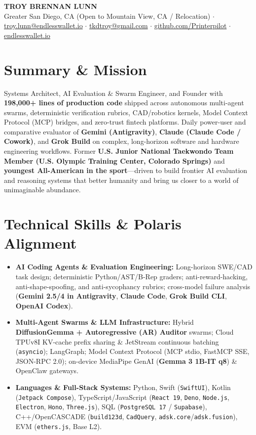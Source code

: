 \documentclass[10pt,letterpaper]{article}
\begin{document}
\begin{center}
    {\LARGE \textbf{TROY BRENNAN LUNN}} \\[2pt]
    Greater San Diego, CA (Open to Mountain View, CA / Relocation) $\cdot$
    \href{mailto:troy.lunn@endlesswallet.io}{troy.lunn@endlesswallet.io} $\cdot$
    \href{mailto:tkdtroy@gmail.com}{tkdtroy@gmail.com} $\cdot$
    \href{https://github.com/Printerpilot}{github.com/Printerpilot} $\cdot$
    \href{https://endlesswallet.io}{endlesswallet.io}
\end{center}

\section{Summary \& Mission}
Systems Architect, AI Evaluation \& Swarm Engineer, and Founder with \textbf{198,000+ lines of production code} shipped across autonomous multi-agent swarms, deterministic verification rubrics, CAD/robotics kernels, Model Context Protocol (MCP) bridges, and zero-trust fintech platforms. Daily power-user and comparative evaluator of \textbf{Gemini (Antigravity)}, \textbf{Claude (Claude Code / Cowork)}, and \textbf{Grok Build} on complex, long-horizon software and hardware engineering workflows. Former \textbf{U.S. Junior National Taekwondo Team Member (U.S. Olympic Training Center, Colorado Springs)} and \textbf{youngest All-American in the sport}---driven to build frontier AI evaluation and reasoning systems that better humanity and bring us closer to a world of unimaginable abundance.

\section{Technical Skills \& Polaris Alignment}
\begin{itemize}
    \item \textbf{AI Coding Agents \& Evaluation Engineering:} Long-horizon SWE/CAD task design; deterministic Python/AST/B-Rep graders; anti-reward-hacking, anti-shape-spoofing, and anti-sycophancy rubrics; cross-model failure analysis (\textbf{Gemini 2.5/4 in Antigravity}, \textbf{Claude Code}, \textbf{Grok Build CLI}, \textbf{OpenAI Codex}).
    \item \textbf{Multi-Agent Swarms \& LLM Infrastructure:} Hybrid \textbf{DiffusionGemma + Autoregressive (AR) Auditor} swarms; Cloud TPUv8I KV-cache prefix sharing \& JetStream continuous batching (\texttt{asyncio}); LangGraph; Model Context Protocol (MCP stdio, FastMCP SSE, JSON-RPC 2.0); on-device MediaPipe GenAI (\textbf{Gemma 3 1B-IT q8}) \& OpenClaw gateways.
    \item \textbf{Languages \& Full-Stack Systems:} Python, Swift (\texttt{SwiftUI}), Kotlin (\texttt{Jetpack Compose}), TypeScript/JavaScript (\texttt{React 19}, \texttt{Deno}, \texttt{Node.js}, \texttt{Electron}, \texttt{Hono}, \texttt{Three.js}), SQL (\texttt{PostgreSQL 17} / \texttt{Supabase}), C++/OpenCASCADE (\texttt{build123d}, \texttt{CadQuery}, \texttt{adsk.core}/\texttt{adsk.fusion}), EVM (\texttt{ethers.js}, Base L2).
\end{itemize}
\end{document}
